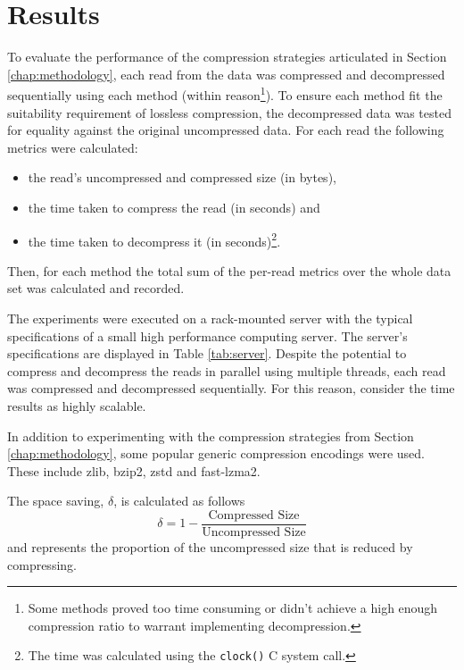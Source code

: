 \chapter{Results} \label{chap:results}



To evaluate the performance of the compression strategies articulated
in Section \ref{chap:methodology}, each read from the data was compressed and
decompressed sequentially using each method (within reason\footnote{Some
methods proved too time consuming or didn't achieve a high enough compression
ratio to warrant implementing decompression.}).
To ensure each method fit the suitability requirement of lossless compression, the
decompressed data was tested for equality against the original uncompressed data.
For each read the following metrics were calculated:
\begin{itemize}
	\item the read's uncompressed and compressed size (in bytes),
	\item the time taken to compress the read (in seconds) and
	\item the time taken to decompress it (in seconds)\footnote{The time was calculated
		using the \texttt{clock()}\cite{c-clock} C system call.}.
\end{itemize}
Then, for each method the total sum of the per-read metrics over the whole data
set was calculated and recorded.

The experiments were executed on a rack-mounted server with the typical
specifications of a small high performance computing server. The server's
specifications are displayed in Table \ref{tab:server}. Despite the potential to
compress and decompress the reads in parallel using multiple threads, each read
was compressed and decompressed sequentially. For this reason, consider the time
results as highly scalable.

In addition to experimenting with the compression strategies from Section
\ref{chap:methodology}, some popular generic compression encodings were used.
These include zlib, bzip2, zstd and fast-lzma2.

The space saving, $\delta$, is calculated as follows
\[ \delta = 1 - \frac{\text{Compressed Size}}{\text{Uncompressed Size}} \]
and represents the proportion of the uncompressed size that is reduced by
compressing.







%
